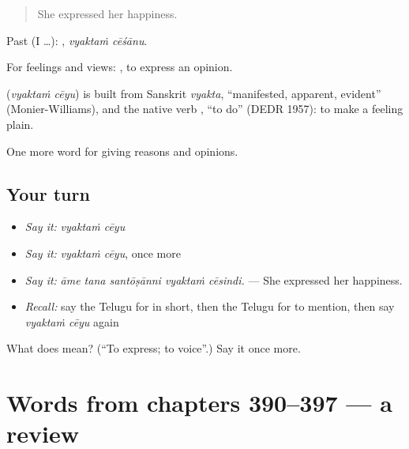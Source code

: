 \begin{quote}
She expressed her happiness.
\end{quote}

Past (I …):  , \emph{vyaktaṁ cēśānu}.

For feelings and views:   , to express an opinion.

\begin{cousinweb}
\textbf{ } (\emph{vyaktaṁ cēyu}) is built from Sanskrit \emph{vyakta}, \textquotedblleft{}manifested, apparent, evident\textquotedblright{} (Monier-Williams), and the native verb , \textquotedblleft{}to do\textquotedblright{} (DEDR 1957): to make a feeling plain.
\end{cousinweb}

\begin{grammarlens}[title={What you've built}]
One more word for giving reasons and opinions.
\end{grammarlens}

\subsection*{Your turn}
\begin{itemize}
\raggedright
  \item \emph{Say it:} \emph{vyaktaṁ cēyu}
  \item \emph{Say it:} \emph{vyaktaṁ cēyu}, once more
  \item \emph{Say it:} \emph{āme tana santōṣānni vyaktaṁ cēsindi.} — She expressed her happiness.
  \item \emph{Recall:} say the Telugu for in short, then the Telugu for to mention, then say \emph{vyaktaṁ cēyu} again
\end{itemize}

\begin{tcolorbox}[breakable,colback=teal!4,colframe=teal!35!black,title={Before you move on}]
What does   mean? (\textquotedblleft{}To express; to voice\textquotedblright{}.) Say it once more.
\end{tcolorbox}
\section[(dialogue)]{Words from chapters 390–397 — a review}

\label{lesson:TE-R397-review-390-397}




